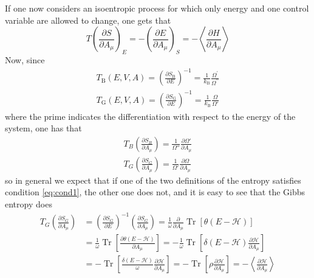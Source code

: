 If one now considers an isoentropic process for which only energy and one control variable are allowed to change, one gets that
\begin{equation}
    T\left(\frac{\partial S}{\partial A_{\mu}}\right)_{E}=-\left(\frac{\partial E}{\partial A_{\mu}}\right)_{S}=-\left\langle\frac{\partial H}{\partial A_{\mu}}\right\rangle
    \label{eq:cond1}
\end{equation}
Now, since
\begin{equation}
    \begin{array}{l}
        T_{\mathrm{B}}(E, V, A)=\left(\frac{\partial S_{\mathrm{B}}}{\partial E}\right)^{-1} = \frac{1}{k_{\mathrm{B}}} \frac{\Omega^{\prime}}{\Omega^{\prime \prime}} \\
        T_{\mathrm{G}}(E, V, A)=\left(\frac{\partial S_{\mathrm{G}}}{\partial E}\right)^{-1}=\frac{1}{k_{\mathrm{B}}} \frac{\Omega}{\Omega'}
        \end{array}
    \label{eq:temperatures_definition}
\end{equation}
where the prime indicates the differentiation with respect to the energy of the system, one has that 
\begin{gather*}
    T_B \left(\frac{\partial S_B}{\partial A_{\mu}}\right) = \frac{1}{\Omega''} \frac{\partial \Omega'}{\partial A_{\mu}} \\
    T_G \left(\frac{\partial S_G}{\partial A_{\mu}}\right) = \frac{1}{\Omega'} \frac{\partial \Omega}{\partial A_{\mu}}
\end{gather*}
so in general we expect that if one of the two definitions of the entropy satisfies condition \ref{eq:cond1}, the other one does not, and it is easy to see that the Gibbs entropy does
\begin{equation*}\begin{aligned}
    T_{G}\left(\frac{\partial S_{G}}{\partial A_{\mu}}\right) &=\left(\frac{\partial S_{G}}{\partial E}\right)^{-1}\left(\frac{\partial S_{G}}{\partial A_{\mu}}\right)=\frac{1}{\omega} \frac{\partial}{\partial A_{\mu}} \operatorname{Tr}[\theta(E-\mathcal{H})] \\
    &=\frac{1}{\omega} \operatorname{Tr}\left[\frac{\partial \theta(E-\mathcal{H})}{\partial A_{\mu}}\right]=-\frac{1}{\omega} \operatorname{Tr}\left[\delta(E-\mathcal{H}) \frac{\partial \mathcal{H}}{\partial A_{\mu}}\right] \\
    &=-\operatorname{Tr}\left[\frac{\delta(E-\mathcal{H})}{\omega} \frac{\partial \mathcal{H}}{\partial A_{\mu}}\right]=-\operatorname{Tr}\left[\rho \frac{\partial \mathcal{H}}{\partial A_{\mu}}\right]=-\left\langle\frac{\partial \mathcal{H}}{\partial A_{\mu}}\right\rangle
\end{aligned}\end{equation*}
